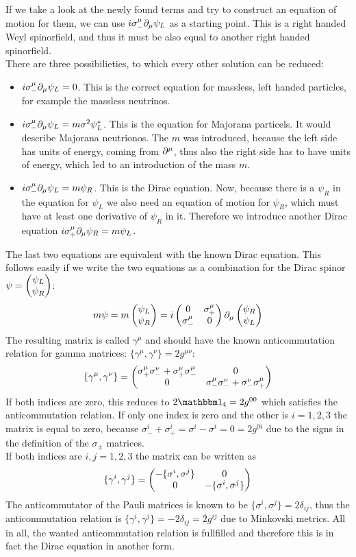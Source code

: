If we take a look at the newly found terms and try to construct an equation of motion for them, we can use $i \sigma_-^\mu\partial_\mu \psi_L$ as a starting point. This is a right handed Weyl spinorfield, and thus it must be also equal to another right handed spinorfield.\\
There are three possibilieties, to which every other solution can be reduced:
\begin{itemize}
\item $i \sigma_-^\mu \partial_\mu \psi_L = 0$. This is the correct equation for massless, left handed particles, for example the massless neutrinos.
\item $i \sigma_-^\mu \partial_\mu \psi_L = m \sigma^2 \psi_L^*$. This is the equation for Majorana particels. It would describe Majorana neutrionos. The $m$ was introduced, because the left side has units of energy, coming from $\partial^\mu$, thus also the right side has to have units of energy, which led to an introduction of the mass $m$.
\item $i \sigma_-^\mu \partial_\mu \psi_L = m \psi_R$. This is the Dirac equation. Now, because there is a $\psi_R$ in the equation for $\psi_L$ we also need an equation of motion for $\psi_R$, which must have at least one derivative of $\psi_R$ in it. Therefore we introduce another Dirac equation $i \sigma_+^\mu \partial_\mu \psi_R = m \psi_L$.
\end{itemize}
The last two equations are equivalent with the known Dirac equation. This follows easily if we write the two equations as a combination for the Dirac spinor $\psi = \begin{pmatrix} \psi_L \\ \psi_R \end{pmatrix}$:
\[ m \psi = m \begin{pmatrix} \psi_L \\ \psi_R \end{pmatrix} = i \begin{pmatrix}0&\sigma_+^\mu\\\sigma_-^\mu&0\end{pmatrix} \partial_\mu\begin{pmatrix} \psi_R \\ \psi_L \end{pmatrix}\]
The resulting matrix is called $\gamma^\mu$ and should have the known anticommutation relation for gamma matrices: $\{\gamma^\mu, \gamma^\nu\} = 2g^{\mu\nu}$:
\[\{\gamma^\mu, \gamma^\nu\} = \begin{pmatrix}\sigma_+^\mu\sigma_-^\nu + \sigma_+^\nu\sigma_-^\mu&0\\0&\sigma_-^\mu\sigma_-^\nu+ \sigma_-^\nu\sigma_+^\mu\end{pmatrix}\]
If both indices are zero, this reduces to $2\ehm_4 = 2 g^{00}$ which satisfies the anticommutation relation. If only one index is zero and the other is $i = 1,2,3$ the matrix is equal to zero, because $\sigma_-^i + \sigma_+^i = \sigma^i - \sigma^i = 0 = 2 g^{0i}$ due to the signs in the definition of the $\sigma_\pm$ matrices. \\
If both indices are $i,j = 1,2,3$ the matrix can be written as 
\[ \{\gamma^i,\gamma^j\} = \begin{pmatrix}-\{\sigma^i,\sigma^j\}&0\\0&-\{\sigma^i,\sigma^j\}\end{pmatrix}\]
The anticommutator of the Pauli matrices is known to be $\{\sigma^i, \sigma^j\} = 2\delta_{ij}$, thus the anticommutation relation is $\{\gamma^i,\gamma^j\} = - 2\delta_{ij} = 2 g^{ij}$ due to Minkovski metrics. All in all, the wanted anticommutation relation is fullfilled and therefore this is in fact the Dirac equation in another form.

